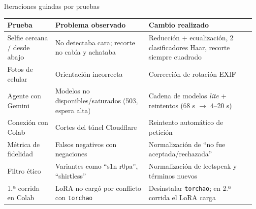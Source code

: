 \documentclass[aspectratio=169,11pt]{beamer}
\begin{document}
\begin{frame}{Iteraciones guiadas por pruebas}
  \centering
  \scriptsize
  \setlength{\tabcolsep}{5pt}
  \renewcommand{\arraystretch}{1.15}
  \begin{tabular}{@{}p{3.2cm}p{5.0cm}p{5.0cm}@{}}
    \toprule
    \textbf{Prueba} & \textbf{Problema observado} & \textbf{Cambio realizado} \\
    \midrule
    Selfie cercana / desde abajo & No detectaba cara; recorte no cabía y achataba & Reducción + ecualización, 2 clasificadores Haar, recorte siempre cuadrado \\
    Fotos de celular & Orientación incorrecta & Corrección de rotación EXIF \\
    Agente con Gemini & Modelos no disponibles/saturados (503, espera alta) & Cadena de modelos \emph{lite} + reintentos (68 s $\rightarrow$ 4--20 s) \\
    Conexión con Colab & Cortes del túnel Cloudflare & Reintento automático de petición \\
    Métrica de fidelidad & Falsos negativos con negaciones & Normalización de “no fue aceptada/rechazada” \\
    Filtro ético & Variantes como “s1n r0pa”, “shirtless” & Normalización de leetspeak y términos nuevos \\
    1.ª corrida en Colab & LoRA no cargó por conflicto con \texttt{torchao} & Desinstalar \texttt{torchao}; en 2.ª corrida el LoRA carga \\
    \bottomrule
  \end{tabular}
\end{frame}
\end{document}
